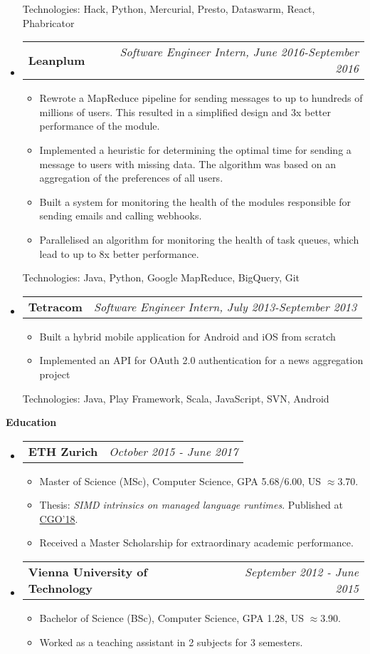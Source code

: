 \documentclass[letterpaper,10pt]{article}
\makeatletter
\newcommand{\resheading}[1]{{\large \colorbox{mygrey}{\begin{minipage}{\textwidth}{\textbf{#1 \vphantom{p\^{E}}}}\end{minipage}}}}
\newcommand{\ressubheading}[4]{
\begin{tabular*}{7.0in}{l@{\extracolsep{\fill}}r}
		\textbf{#1} & \textit{#4} \\
\end{tabular*}\vspace{-6pt}}
\makeatother
\begin{document}
\begin{itemize}
\begin{itemize}
	\end{itemize}
Technologies: Hack, Python, Mercurial, Presto, Dataswarm, React, Phabricator
\item
	\ressubheading{Leanplum}{Sofia, Bulgaria}{Software Engineer Intern}{Software Engineer Intern, June 2016-September 2016}
	\begin{itemize}
	\item Rewrote a MapReduce pipeline for sending messages to up to hundreds of millions of users. This resulted in a simplified design and 3x better performance of the module.
     \item Implemented a heuristic for determining the optimal time for sending a message to users with missing data. The algorithm was based on an aggregation of the preferences of all users.
     \item Built a system for monitoring the health of the modules responsible for sending emails and calling webhooks.
     \item Parallelised an algorithm for monitoring the health of task queues, which lead to up to 8x better performance.
	\end{itemize}
Technologies: Java, Python, Google MapReduce, BigQuery, Git
\item
	\ressubheading{Tetracom}{Sofia, Bulgaria}{Software Engineer Intern}{Software Engineer Intern, July 2013-September 2013}
	\begin{itemize}
    \item Built a hybrid mobile application for Android and iOS from scratch
    \item Implemented an API for OAuth 2.0 authentication for a news aggregation project
	\end{itemize}
Technologies: Java, Play Framework, Scala, JavaScript, SVN, Android
\end{itemize}


\resheading{Education}
\begin{itemize}
\item
\ressubheading{ETH Zurich}{}{}{October 2015 - June 2017}
\begin{itemize}
\item Master of Science (MSc), Computer Science, GPA 5.68/6.00, US $\approx$3.70.
\item Thesis: {\it{SIMD intrinsics on managed language runtimes}}. Published at  \href{https://dl.acm.org/doi/10.1145/3168810}{CGO'18}.
\item Received a Master Scholarship for extraordinary academic performance.
\end{itemize}

\item \ressubheading{Vienna University of Technology}{}{}{September 2012 - June 2015}
\begin{itemize}
\item Bachelor of Science (BSc), Computer Science, GPA 1.28, US $\approx$3.90.
\item Worked as a teaching assistant in 2 subjects for 3 semesters.
\end{itemize}

\end{itemize}
\end{document}
